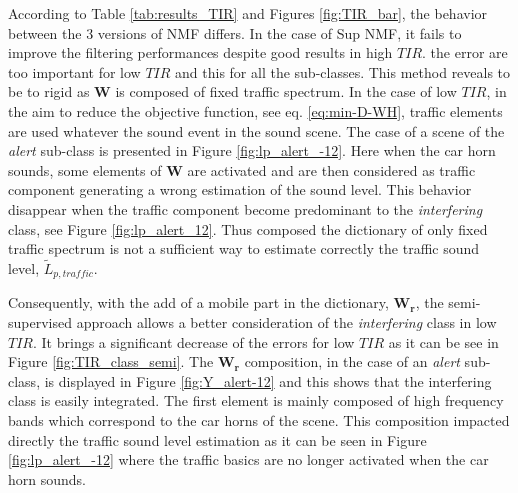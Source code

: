 \documentclass[twocolumn,a4paper,10pt]{article}
\begin{document}
According to Table \ref{tab:results_TIR} and Figures \ref{fig:TIR_bar}, the behavior between the 3 versions of NMF differs. In the case of Sup NMF, it fails to improve the filtering performances despite good results in high $TIR$.  the error are too important for low $TIR$ and this for all the sub-classes. This method reveals to be to rigid as $\mathbf{W}$ is composed of fixed traffic spectrum. In the case of low $TIR$, in the aim to reduce the objective function, see eq. \ref{eq:min-D-WH}, traffic elements are used whatever the sound event in the  sound scene. The case of a scene of the \textit{alert} sub-class is presented in Figure \ref{fig:lp_alert_-12}. Here when the car horn sounds, some elements of $\mathbf{W}$ are activated and are then considered as traffic component generating a wrong estimation of the sound level. This behavior disappear when the traffic component become predominant to the \textit{interfering} class, see Figure \ref{fig:lp_alert_12}. Thus composed the dictionary of only fixed traffic spectrum is not a sufficient way to estimate correctly the traffic sound level, $\tilde{L}_{p,traffic}$.

Consequently, with the add of a mobile part in the dictionary, $\mathbf{W_r}$, the semi-supervised approach  allows a better consideration of the \textit{interfering} class in low $TIR$. It brings a significant decrease of the errors for low $TIR$ as it can be see in Figure \ref{fig:TIR_class_semi}. The $\mathbf{W_r}$ composition, in the case of an \textit{alert} sub-class, is displayed in Figure \ref{fig:Y_alert-12} and this shows that the interfering class is easily integrated. The first element is mainly composed of high frequency bands which correspond to the car horns of the scene. This composition impacted directly the traffic sound level estimation as it can be seen in Figure \ref{fig:lp_alert_-12} where the traffic basics are no longer activated when the car horn sounds.
\end{document}
